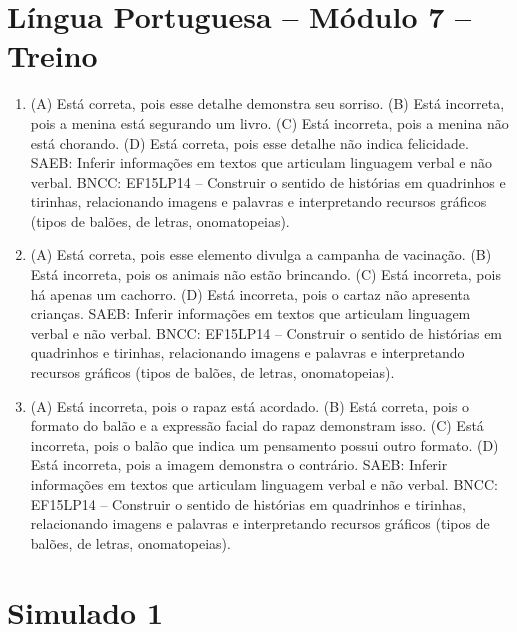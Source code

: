 \section*{Língua Portuguesa – Módulo 7 – Treino}

\begin{enumerate}
\item
(A) Está correta, pois esse detalhe demonstra seu sorriso.
(B) Está incorreta, pois a menina está segurando um livro.
(C) Está incorreta, pois a menina não está chorando.
(D) Está correta, pois esse detalhe não indica felicidade.
SAEB: Inferir informações em textos que articulam linguagem verbal e não verbal.
BNCC: EF15LP14 -- Construir o sentido de histórias em quadrinhos
e tirinhas, relacionando imagens e palavras e interpretando recursos
gráficos (tipos de balões, de letras, onomatopeias).

\item
(A) Está correta, pois esse elemento divulga a campanha de vacinação.
(B) Está incorreta, pois os animais não estão brincando.
(C) Está incorreta, pois há apenas um cachorro.
(D) Está incorreta, pois o cartaz não apresenta crianças.
SAEB: Inferir informações em textos que articulam linguagem verbal e não verbal.
BNCC: EF15LP14 -- Construir o sentido de histórias em quadrinhos
e tirinhas, relacionando imagens e palavras e interpretando recursos
gráficos (tipos de balões, de letras, onomatopeias).

\item
(A) Está incorreta, pois o rapaz está acordado.
(B) Está correta, pois o formato do balão e a expressão facial do rapaz
demonstram isso.
(C) Está incorreta, pois o balão que indica um pensamento possui outro formato.
(D) Está incorreta, pois a imagem demonstra o contrário.
SAEB: Inferir informações em textos que articulam linguagem
verbal e não verbal.
BNCC: EF15LP14 -- Construir o sentido de histórias em quadrinhos
e tirinhas, relacionando imagens e palavras e interpretando recursos
gráficos (tipos de balões, de letras, onomatopeias).
\end{enumerate}

\section*{Simulado 1}

